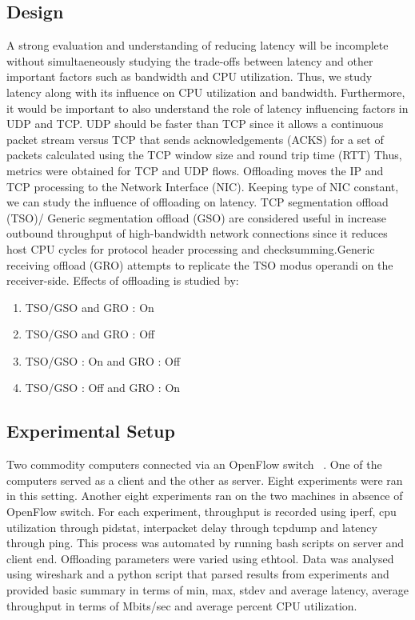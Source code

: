 \documentclass[letterpaper,twocolumn,10pt]{article}
\begin{document}
\subsection{Design}
A strong evaluation and understanding of reducing latency will be incomplete
without simultaeneously studying the trade-offs between latency and other
important factors such as bandwidth and CPU utilization. Thus, we study latency
along with its influence on CPU utilization and bandwidth. Furthermore, it would be 
important to also understand the role of latency influencing factors in UDP and
TCP. UDP should be faster than TCP since it allows a continuous packet stream
versus TCP that sends acknowledgements (ACKS) for a set of packets calculated
using the TCP window size and round trip time (RTT) Thus, metrics were obtained
for TCP and UDP flows.  Offloading moves the IP and TCP processing to the
Network Interface (NIC).  Keeping type of NIC constant, we can study the
influence of offloading on latency. TCP segmentation offload (TSO)/ Generic
segmentation offload (GSO) are considered useful in increase outbound
throughput of high-bandwidth network connections since it reduces host CPU cycles
for protocol header processing and checksumming.Generic receiving offload (GRO)
    attempts to replicate the TSO modus operandi on the receiver-side. Effects
    of offloading is studied by:

\begin{enumerate} 
\item TSO/GSO and GRO : On 
\item TSO/GSO and GRO : Off 
\item TSO/GSO : On and GRO : Off 
\item TSO/GSO : Off and GRO : On 
\end{enumerate} 

\subsection{Experimental Setup} 
Two commodity computers connected via an OpenFlow switch ~\cite{openflow}. One
of the computers served as a client and the other as server. Eight experiments
were ran in this setting. Another eight experiments ran on the two machines in
absence of OpenFlow switch. For each experiment, throughput is recorded using
iperf, cpu utilization through pidstat, interpacket delay through tcpdump and
latency through ping. This process was automated by running bash scripts on
server and client end. Offloading parameters were varied using ethtool. Data was
analysed using wireshark and a python script that parsed results from
experiments and provided basic summary in terms of min, max, stdev and average latency, 
average throughput in terms of Mbits/sec and average percent CPU utilization.
\end{document}
